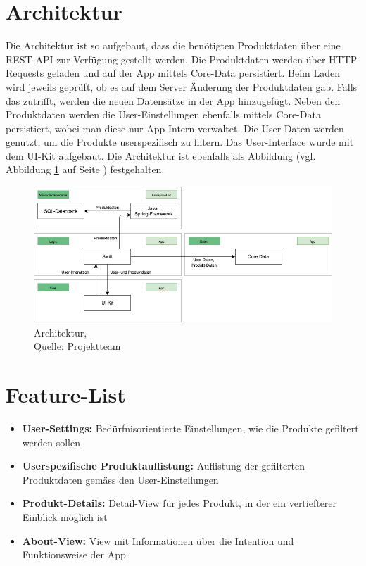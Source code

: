 \documentclass[12pt,titlepage]{article}
\begin{document}
\section*{Architektur}
Die Architektur ist so aufgebaut, dass die benötigten Produktdaten über eine REST-API zur Verfügung gestellt werden. Die Produktdaten werden über HTTP-Requests geladen und auf der App mittels Core-Data persistiert. Beim Laden wird jeweils geprüft, ob es auf dem Server Änderung der Produktdaten gab. Falls das zutrifft, werden die neuen Datensätze in der App hinzugefügt. Neben den Produktdaten werden die User-Einstellungen ebenfalls mittels Core-Data persistiert, wobei man diese nur App-Intern verwaltet. Die User-Daten werden genutzt, um die Produkte userspezifisch zu filtern. Das User-Interface wurde mit dem UI-Kit aufgebaut. Die Architektur ist ebenfalls als Abbildung (vgl. Abbildung \ref{img: Architektur} auf Seite \pageref{img: Architektur}) festgehalten.\\
\begin{figure}[H]
	\centering
	\includegraphics[width=16cm]{Img/Architektur2.png}
	\caption[Architektur]{Architektur,\\ Quelle: Projektteam}
	\label{img: Architektur}
\end{figure}

\section{Feature-List}
\begin{itemize}
	\item \textbf{User-Settings:} Bedürfnisorientierte Einstellungen, wie die Produkte gefiltert werden sollen
	\item \textbf{Userspezifische Produktauflistung:} Auflistung der gefilterten Produktdaten gemäss den User-Einstellungen
	\item \textbf{Produkt-Details:} Detail-View für jedes Produkt, in der ein vertiefterer Einblick möglich ist
	\item \textbf{About-View:} View mit Informationen über die Intention und Funktionsweise der App
\end{itemize}
\end{document}
